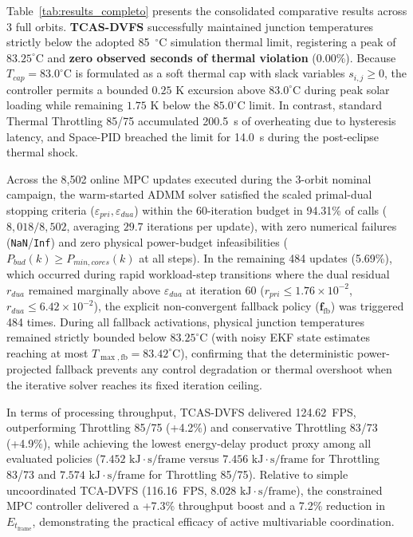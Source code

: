 \documentclass[a4paper,fleqn]{cas-dc}
\begin{document}
Table~\ref{tab:results_completo} presents the consolidated comparative results across 3 full orbits. \textbf{TCAS-DVFS} successfully maintained junction temperatures strictly below the adopted 85~$^\circ$C simulation thermal limit, registering a peak of $83.25^\circ\text{C}$ and \textbf{zero observed seconds of thermal violation} ($0.00\%$). Because $T_{cap} = 83.0^\circ\text{C}$ is formulated as a soft thermal cap with slack variables $s_{i,j} \ge 0$, the controller permits a bounded $0.25\text{ K}$ excursion above $83.0^\circ\text{C}$ during peak solar loading while remaining $1.75\text{ K}$ below the $85.0^\circ\text{C}$ limit. In contrast, standard Thermal Throttling 85/75 accumulated 200.5~s of overheating due to hysteresis latency, and Space-PID breached the limit for 14.0~s during the post-eclipse thermal shock.

Across the 8,502 online MPC updates executed during the 3-orbit nominal campaign, the warm-started ADMM solver satisfied the scaled primal-dual stopping criteria ($\varepsilon_{pri}, \varepsilon_{dua}$) within the 60-iteration budget in 94.31\% of calls ($8,018/8,502$, averaging $29.7$ iterations per update), with zero numerical failures (\texttt{NaN}/\texttt{Inf}) and zero physical power-budget infeasibilities ($P_{bud}(k) \ge P_{min,cores}(k)$ at all steps). In the remaining 484 updates (5.69\%), which occurred during rapid workload-step transitions where the dual residual $r_{dua}$ remained marginally above $\varepsilon_{dua}$ at iteration 60 ($r_{pri} \le 1.76\times 10^{-2}$, $r_{dua} \le 6.42\times 10^{-2}$), the explicit non-convergent fallback policy ($\mathbf{f}_{\mathrm{fb}}$) was triggered 484 times. During all fallback activations, physical junction temperatures remained strictly bounded below $83.25^\circ\text{C}$ (with noisy EKF state estimates reaching at most $T_{\max,\mathrm{fb}} = 83.42^\circ\text{C}$), confirming that the deterministic power-projected fallback prevents any control degradation or thermal overshoot when the iterative solver reaches its fixed iteration ceiling.

In terms of processing throughput, TCAS-DVFS delivered 124.62~FPS, outperforming Throttling 85/75 (+4.2\%) and conservative Throttling 83/73 (+4.9\%), while achieving the lowest energy-delay product proxy among all evaluated policies ($7.452\text{ kJ}\cdot\text{s/frame}$ versus $7.456\text{ kJ}\cdot\text{s/frame}$ for Throttling 83/73 and $7.574\text{ kJ}\cdot\text{s/frame}$ for Throttling 85/75). Relative to simple uncoordinated TCA-DVFS (116.16~FPS, $8.028\text{ kJ}\cdot\text{s/frame}$), the constrained MPC controller delivered a +7.3\% throughput boost and a 7.2\% reduction in $E_{t_{\mathrm{frame}}}$, demonstrating the practical efficacy of active multivariable coordination.
\end{document}
